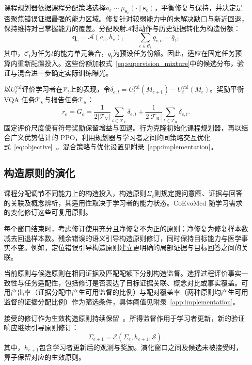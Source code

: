 课程规划器依据课程分配策略选择$a_e\sim\mu_{\theta_e}(\cdot\mid \mathbf{s}_e)$，平衡修复与保持，并决定是否聚焦错误证据最强的能力区域。修复针对较弱能力中的未解决缺口与新近回退，保持维持对已掌握能力的覆盖。分配映射$\mathcal A$将动作与历史证据转化为构造份额：
\begin{equation}
\boldsymbol q_e=\mathcal A(a_e,h_e),\qquad
\sum_{c\in\mathcal C_t}q_{e,c}=\bar q_t,
\label{eq:quota}
\end{equation}
其中，$\mathcal C_t$为任务$t$的能力单元集合，$\bar q_t$为预设任务份额。因此，适应在固定任务预算内重新配置投入。这些份额加权式~\ref{eq:supervision_mixture}中的候选分布，验证与混合进一步确定实际训练曝光。

以$U_t^{\mathrm{val}}$评价学习者在$\mathcal V_t$上的表现，令$\delta_{e,t}=U_t^{\mathrm{val}}(M_{e+1})-U_t^{\mathrm{val}}(M_e)$。奖励平衡 VQA 任务$\mathcal T_{\mathrm V}$与报告任务$\mathcal T_{\mathrm R}$：
\begin{equation}
r_e=G_e=\frac{1}{2|\mathcal T_{\mathrm V}|}\sum_{t\in\mathcal T_{\mathrm V}}\delta_{e,t}
+\frac{1}{2|\mathcal T_{\mathrm R}|}\sum_{t\in\mathcal T_{\mathrm R}}\delta_{e,t}.
\label{eq:gain}
\end{equation}
固定评价尺度使有符号奖励保留增益与回退。行为克隆初始化课程规划器，再以结合广义优势估计的 PPO，利用规划器与学习者之间的同策略交互优化式~\ref{eq:objective}~\citep{schulman2017proximal,schulman2016high}。混合策略与优化设置见附录~\ref{app:implementation}。

\subsection{构造原则的演化}
\label{sec:strategy_evolution}

课程分配调节不同能力上的构造投入，构造原则$\Sigma_e$则规定提问意图、证据与回答的关联及概念辨析，其适用性取决于学习者的能力状态。CoEvoMed 随学习需求的变化修订这些可复用原则。

每个窗口结束时，考虑修订使用充分且净修复不为正的原则；净修复为修复样本数减去回退样本数。残余错误的语义引导构造原则修订，同时保持目标能力与医学事实不变。例如，定位错误引导构造原则建立更明确的局部证据与目标回答之间的关联。

当前原则与候选原则在相同证据及匹配配额下分别构造监督。选择过程评价事实一致性与任务适配性，包括修订是否表达了目标证据关联、概念对比或事实覆盖。可用产出率（证据分配中产生可用监督的比例）与配对覆盖率（两种原则均产生可用监督的证据分配比例）作为筛选条件，具体阈值见附录~\ref{app:implementation}。

接受的修订作为生效构造原则持续保留~\citep{zhang2026agentic}。所得监督作用于学习者更新，新的验证响应继续引导原则修订：
\begin{equation}
\Sigma_{e+1}=\mathscr E(\Sigma_e,h_{e+1},\mathcal S).
\label{eq:strategy_evolution}
\end{equation}
其中，$h_{e+1}$包含学习者更新后的观测与奖励。演化窗口之间及候选未被接受时，算子保留对应的生效原则。


